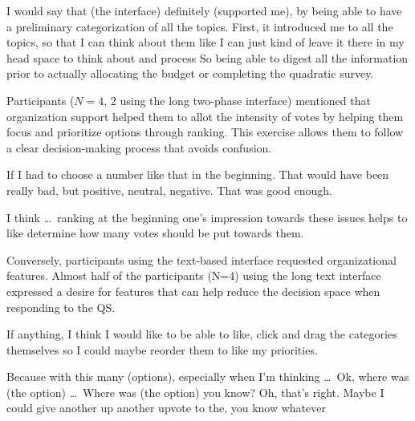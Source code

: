 \begin{displayquote}
I would say that (the interface) definitely (supported me), by being able to have a preliminary categorization of all the topics. First, it introduced me to all the topics, so that I can think about them like I can just kind of leave it there in my head space to think about and process \bracketellipsis So being able to digest all the information prior to actually allocating the budget or completing the quadratic survey. \hfill{}
\end{displayquote}

Participants ($N=4$, $2$ using the long two-phase interface) mentioned that organization support helped them to allot the intensity of votes by helping them focus and prioritize options through ranking. This exercise allows them to follow a clear decision-making process that avoids confusion.

\begin{displayquote}
If I had to choose a number like that in the beginning. That would have been really bad, but positive, neutral, negative. That was good enough. \hfill{}
\end{displayquote}

\begin{displayquote}
I think \ldots\ ranking at the beginning one's impression towards these issues helps to like determine how many votes should be put towards them.  \hfill{}
\end{displayquote}

Conversely, participants using the text-based interface requested organizational features. Almost half of the participants (N=4) using the long text interface expressed a desire for features that can help reduce the decision space when responding to the QS.

\begin{displayquote}
If anything, I think I would like to be able to like, click and drag the categories themselves so I could maybe reorder them to like my priorities. \hfill{}
\end{displayquote}

\begin{displayquote}
Because with this many (options), especially when I'm thinking \ldots\ Ok, where was (the option) \ldots\ Where was (the option) you know? Oh, that's right. Maybe I could give another up another upvote to the, you know whatever~\bracketellipsis \hfill{}
\end{displayquote}

